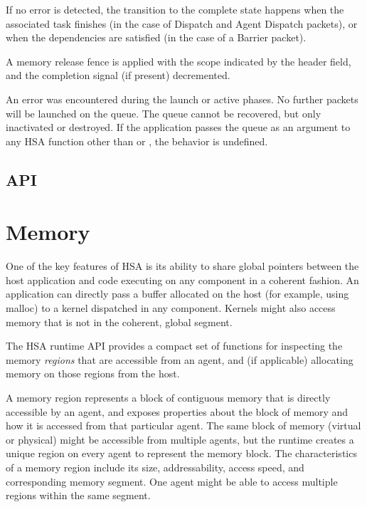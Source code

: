 \documentclass[final,oneside]{book}
\begin{document}
\begin{description}[itemsep=2pt,leftmargin=0cm, labelindent=0cm]
  If no error is detected, the transition to the complete state happens when the
  associated task finishes (in the case of Dispatch and Agent Dispatch packets),
  or when the dependencies are satisfied (in the case of a Barrier packet).

\item[Complete] A memory release fence is applied with the scope indicated by
  the  header field, and the
  completion signal (if present) decremented.

\item[Error] An error was encountered during the launch or active phases. No
  further packets will be launched on the queue. The queue cannot be recovered,
  but only inactivated or destroyed. If the application passes the queue as an
  argument to any HSA function other than  or
  , the behavior is undefined.

\end{description}
\newpage %
\subsection{API}


\section{Memory}\label{sec:memory}

One of the key features of HSA is its ability to share global pointers between
the host application and code executing on any component in a coherent
fashion. An application can directly pass a buffer allocated on the host (for
example, using malloc) to a kernel dispatched in any component. Kernels might
also access memory that is not in the coherent, global segment.

The HSA runtime API provides a compact set of functions for inspecting
the memory \emph{regions} that are accessible from  an agent, and (if applicable)
allocating memory on those regions from the host.

A memory region represents a block of contiguous memory that is directly
accessible by an agent, and exposes properties about the block of memory and how
it is accessed from that particular agent. The same block of memory (virtual or
physical) might be accessible from multiple agents, but the runtime creates a
unique region on every agent to represent the memory block. The characteristics
of a memory region include its size, addressability, access speed, and
corresponding memory segment. One agent might be able to access multiple regions
within the same segment.
\end{document}
